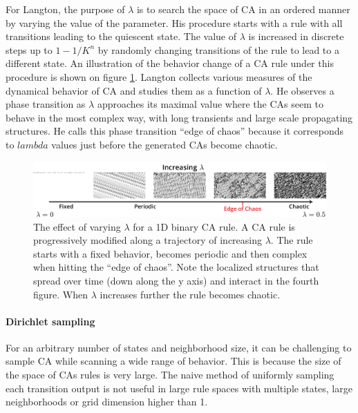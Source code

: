 For Langton, the purpose of $\lambda$ is to search the space of \ac{CA} in an ordered
manner by varying the value of the parameter. His procedure starts with a rule
with all transitions leading to the quiescent state. The value of $\lambda$ is
increased in discrete steps up to $1 - 1 / K^{n}$ by randomly changing
transitions of the rule to lead to a different state. An illustration of the
behavior change of a \ac{CA} rule under this procedure is shown on figure
\ref{fig:langton_lambda}. Langton collects various measures of the dynamical
behavior of \ac{CA} and studies them as a function of $\lambda$. He observes a phase
transition as $\lambda$ approaches its maximal value where the \acp{CA} seem to behave
in the most complex way, with long transients and large scale propagating
structures. He calls this phase transition ``edge of chaos'' because it
corresponds to $lambda$ values just before the generated \acp{CA} become
chaotic.

\begin{figure}[htbp]
  \centering
  \includegraphics[width=\linewidth]{figures/langton_lambda.pdf}
  \caption{The effect of varying $\lambda$ for a 1D binary \ac{CA} rule. A \ac{CA}
    rule is progressively modified along a trajectory of increasing $\lambda$. The
    rule starts with a fixed behavior, becomes periodic and then complex when
    hitting the ``edge of chaos''. Note the localized structures that spread
    over time (down along the y axis) and interact in the fourth figure. When
    $\lambda$ increases further the rule becomes chaotic.}
  \label{fig:langton_lambda}
\end{figure}

\paragraph{Dirichlet sampling}
For an arbitrary number of states and neighborhood size, it can be challenging
to sample \ac{CA} while scanning a wide range of behavior. This is because the
size of the space of \acp{CA} rules is very large. The naive method of uniformly
sampling each transition output is not useful in large rule spaces with multiple
states, large neighborhoods or grid dimension higher than 1.

